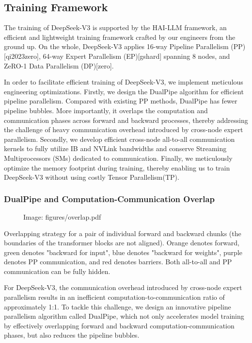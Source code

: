\documentclass[11pt,a4paper]{article}
\begin{document}
\subsection{Training Framework}

The training of DeepSeek-V3 is supported by the HAI-LLM framework, an efficient and lightweight training framework crafted by our engineers from the ground up. 
On the whole, DeepSeek-V3 applies 16-way Pipeline Parallelism (PP)[qi2023zero], 64-way Expert Parallelism (EP)[gshard] spanning 8 nodes, and ZeRO-1 Data Parallelism (DP)[zero].

In order to facilitate efficient training of DeepSeek-V3, we implement meticulous engineering optimizations.
Firstly, we design the DualPipe algorithm for efficient pipeline parallelism.
Compared with existing PP methods, DualPipe has fewer pipeline bubbles. 
More importantly, it overlaps the computation and communication phases across forward and backward processes, thereby addressing the challenge of heavy communication overhead introduced by cross-node expert parallelism. 
Secondly, we develop efficient cross-node all-to-all communication kernels to fully utilize IB and NVLink bandwidths and conserve Streaming Multiprocessors (SMs) dedicated to communication. 
Finally, we meticulously optimize the memory footprint during training, thereby enabling us to train DeepSeek-V3 without using costly Tensor Parallelism(TP).

\subsubsection{DualPipe and Computation-Communication Overlap}

\begin{figure}[h]
\caption{Image: figures/overlap.pdf}
\end{figure}

Overlapping strategy for a pair of individual forward and backward chunks (the boundaries of the transformer blocks are not aligned). 
 Orange denotes forward, green denotes "backward for input", blue denotes "backward for weights", purple denotes PP communication, and red denotes barriers.
 Both all-to-all and PP communication can be fully hidden.

For DeepSeek-V3, the communication overhead introduced by cross-node expert parallelism results in an inefficient computation-to-communication ratio of approximately 1:1. 
To tackle this challenge, we design an innovative pipeline parallelism algorithm called DualPipe, which not only accelerates model training by effectively overlapping forward and backward computation-communication phases, but also reduces the pipeline bubbles.
\end{document}
